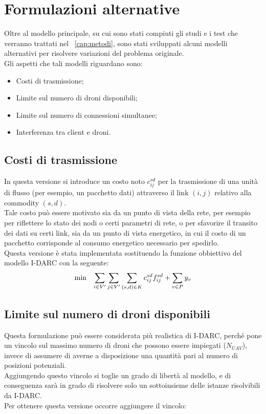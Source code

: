 \section{Formulazioni alternative}
Oltre al modello principale, su cui sono stati compiuti gli studi e i test che verranno trattati nel \chaptername\ \ref{cap:metodi}, sono stati sviluppati alcuni modelli alternativi per risolvere variazioni del problema originale. \\ Gli aspetti che tali modelli riguardano sono:

\begin{itemize}
	\item Costi di trasmissione;
	\item Limite sul numero di droni disponibili;
	\item Limite sul numero di connessioni simultanee;
	\item Interferenza tra client e droni.
\end{itemize}

\subsection{Costi di trasmissione}
In questa versione si introduce un costo noto $c_{ij}^{sd}$ per la trasmissione di una unità di flusso (per esempio, un pacchetto dati) attraverso il link $(i,j)$ relativo alla commodity $(s,d)$. \\
Tale costo può essere motivato sia da un punto di vista della rete, per esempio per riflettere lo stato dei nodi o certi parametri di rete, o per sfavorire il transito dei dati su certi link, sia da un punto di vista energetico, in cui il costo di un pacchetto corrisponde al consumo energetico necessario per spedirlo. \\
Questa versione è stata implementata sostituendo la funzione obbiettivo del modello I-DARC con la seguente: \\

\begin{equation*} \label{eq:costi}
	\begin{array}{rrclcl}
		\displaystyle \min & \multicolumn{3}{l}{\displaystyle \sum_{i \in V'} \displaystyle \sum_{j \in V'} \displaystyle \sum_{(s,d) \in K} c_{ij}^{sd} f_{ij}^{sd} + \displaystyle \sum_{v \in P} y_{v}} \\
	\end{array}
\end{equation*}

\subsection{Limite sul numero di droni disponibili}
Questa formulazione può essere considerata più realistica di I-DARC, perché pone un vincolo sul massimo numero di droni che possono essere impiegati ($N_{UAV}$), invece di assumere di averne a disposizione una quantità pari al numero di posizioni potenziali. \\
Aggiungendo questo vincolo si toglie un grado di libertà al modello, e di conseguenza sarà in grado di risolvere solo un sottoinsieme delle istanze risolvibili da I-DARC. \\
Per ottenere questa versione occorre aggiungere il vincolo:

